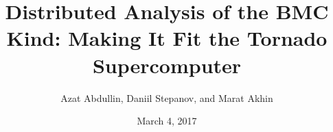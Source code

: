 
\title{Distributed Analysis of the BMC Kind: Making It Fit the Tornado Supercomputer}
\author{Azat Abdullin, Daniil Stepanov, and Marat Akhin}
\date{March 4, 2017}



\begin{frame}
\titlepage
\end{frame} 

%  
